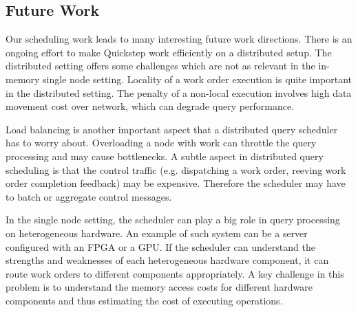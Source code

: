 \subsection{Future Work}
Our scheduling work leads to many interesting future work directions.
There is an ongoing effort to make Quickstep work efficiently on a distributed setup. 
The distributed setting offers some challenges which are not as relevant in the in-memory single node setting.
Locality of a work order execution is quite important in the distributed setting.
The penalty of a non-local execution involves high data movement cost over network, which can degrade query performance.

Load balancing is another important aspect that a distributed query scheduler has to worry about.
Overloading a node with work can throttle the query processing and may cause bottlenecks.
A subtle aspect in distributed query scheduling is that the control traffic (e.g. dispatching a work order, reeving work order completion feedback) may be expensive.
Therefore the scheduler may have to batch or aggregate control messages.

In the single node setting, the scheduler can play a big role in query processing on heterogeneous hardware.
An example of such system can be a server configured with an FPGA or a GPU.
If the scheduler can understand the strengths and weaknesses of each heterogeneous hardware component, it can route work orders to different components appropriately. 
A key challenge in this problem is to understand the memory access costs for different hardware components and thus estimating the cost of executing operations.